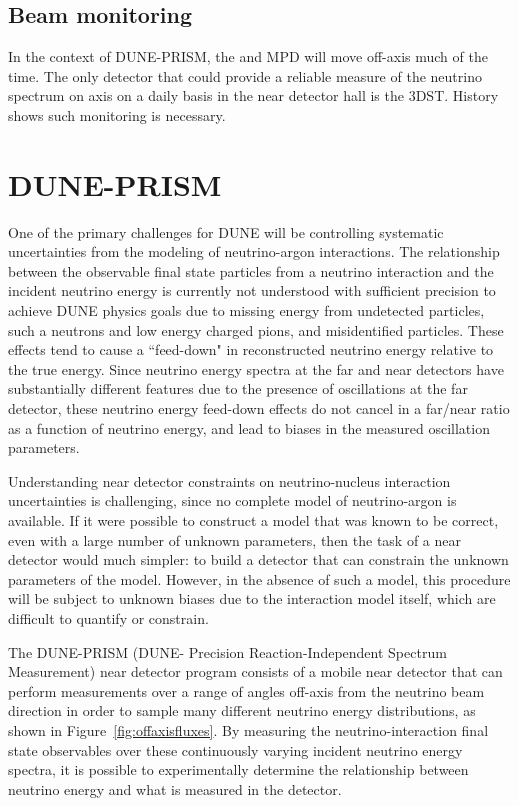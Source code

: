 \subsection{Beam monitoring}

In the context of DUNE-PRISM, the  and MPD will move off-axis much of the time. The only detector that could provide a reliable measure of the neutrino spectrum on axis on a daily basis in the near detector hall is the 3DST. History shows such monitoring is necessary. 




\section{DUNE-PRISM}
\label{sec:exsum-nd-DP}


One of the primary challenges for DUNE will be controlling systematic uncertainties from the modeling of neutrino-argon interactions. The relationship between the observable final state particles from a neutrino interaction and the incident neutrino energy is currently not understood with sufficient precision to achieve DUNE physics goals due to missing energy from undetected particles, such a neutrons and low energy charged pions, and misidentified particles. These effects tend to cause  a ``feed-down" in reconstructed neutrino energy relative to the true energy. Since neutrino energy spectra at the far and near detectors have substantially different features due to the presence of oscillations at the far detector, these neutrino energy feed-down effects do not cancel in a far/near ratio as a function of neutrino energy, and lead to biases in the measured oscillation parameters.

Understanding near detector constraints on neutrino-nucleus interaction uncertainties is challenging, since no complete model of neutrino-argon is available. If it were possible to construct a model that was known to be correct, even with a large number of unknown parameters, then the task of a near detector would much simpler: to build a detector that can constrain the unknown parameters of the model. However, in the absence of such a model, this procedure will be subject to unknown biases due to the interaction model itself, which are difficult to quantify or constrain.

The DUNE-PRISM (DUNE- Precision Reaction-Independent Spectrum Measurement) near detector program consists of a mobile near detector that can perform measurements over a range of angles off-axis from the neutrino beam direction in order to sample many different neutrino energy distributions, as shown in Figure~\ref{fig:offaxisfluxes}. By measuring the neutrino-interaction final state observables over these continuously varying incident neutrino energy spectra, it is possible to experimentally determine the relationship between neutrino energy and what is measured in the detector.

